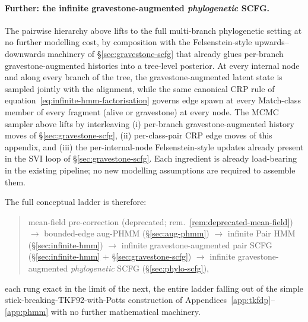 \paragraph{Further: the infinite gravestone-augmented
\emph{phylogenetic} SCFG.} The pairwise hierarchy above lifts to
the full multi-branch phylogenetic setting at no further modelling
cost, by composition with the Felsenstein-style upwards--downwards
machinery of \S\ref{sec:gravestone-scfg} that already glues
per-branch gravestone-augmented histories into a tree-level
posterior. At every internal node and along every branch of the
tree, the gravestone-augmented latent state is sampled jointly
with the alignment, while the same canonical CRP rule of
equation~\ref{eq:infinite-hmm-factorisation} governs edge spawn at
every Match-class member of every fragment (alive or gravestone)
at every node. The MCMC sampler above lifts by interleaving (i)
per-branch gravestone-augmented history moves of
\S\ref{sec:gravestone-scfg}, (ii) per-class-pair CRP edge moves of
this appendix, and (iii) the per-internal-node Felsenstein-style
updates already present in the SVI loop of
\S\ref{sec:gravestone-scfg}. Each ingredient is already
load-bearing in the existing pipeline; no new modelling assumptions
are required to assemble them.

The full conceptual ladder is therefore:
\begin{quote}
mean-field pre-correction (deprecated; rem.~\ref{rem:deprecated-mean-field}) $\to$
bounded-edge aug-PHMM (\S\ref{sec:aug-phmm}) $\to$
infinite Pair HMM (\S\ref{sec:infinite-hmm}) $\to$
infinite gravestone-augmented pair SCFG
  (\S\ref{sec:infinite-hmm} $+$ \S\ref{sec:gravestone-scfg}) $\to$
infinite gravestone-augmented \emph{phylogenetic} SCFG
  (\S\ref{sec:phylo-scfg}),
\end{quote}
each rung exact in the limit of the next, the entire ladder
falling out of the simple stick-breaking-TKF92-with-Potts
construction of Appendices~\ref{app:tkfdp}--\ref{app:phmm} with no
further mathematical machinery.
